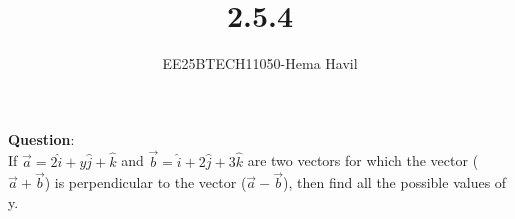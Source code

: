 \documentclass[journal]{IEEEtran}
\begin{document}

\vspace{3cm}
\title{2.5.4}
\author{EE25BTECH11050-Hema Havil}
\maketitle
	{\let\newpage\relax\maketitle}
	
	\renewcommand{\thefigure}{\theenumi}
	\renewcommand{\thetable}{\theenumi}
	\setlength{\intextsep}{12pt} %
	
	\renewcommand{\thetable}{\theenumi}
	
	\textbf{Question}:\\
    
         If $\vec{a}=2\hat{i}+y\hat{j}+\hat{k}$ and $\vec{b}=\hat{i}+2\hat{j}+3\hat{k}$ are two vectors for which the vector ($\vec{a}+\vec{b}$) is perpendicular to the vector ($\vec{a}-\vec{b}$), then find all the possible values of y.\\
         
\end{document}
